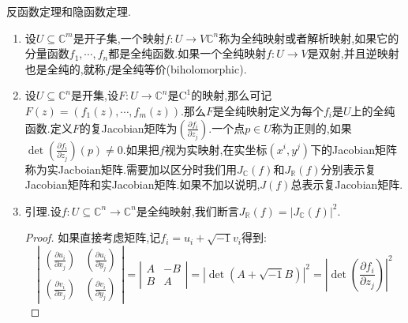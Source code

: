 反函数定理和隐函数定理.
\begin{enumerate}
	\item 设$U\subseteq\mathbb{C}^m$是开子集,一个映射$f:U\to V\mathbb{C}^n$称为全纯映射或者解析映射,如果它的分量函数$f_1,\cdots,f_n$都是全纯函数.如果一个全纯映射$f:U\to V$是双射,并且逆映射也是全纯的,就称$f$是全纯等价(biholomorphic).
	\item 设$U\subseteq\mathbb{C}^n$是开集,设$F:U\to\mathbb{C}^n$是$\mathrm{C}^1$的映射,那么可记$F(z)=(f_1(z),\cdots,f_m(z))$.那么$F$是全纯映射定义为每个$f_i$是$U$上的全纯函数.定义$F$的复Jacobian矩阵为$\left(\frac{\partial f_i}{\partial z_j}\right)$.一个点$p\in U$称为正则的,如果$\det\left(\frac{\partial f_i}{\partial z_j}\right)(p)\not=0$.如果把$f$视为实映射,在实坐标$(x^i,y^j)$下的Jacobian矩阵称为实Jacboian矩阵.需要加以区分时我们用$J_{\mathbb{C}}(f)$和$J_{\mathbb{R}}(f)$分别表示复Jacobian矩阵和实Jacobian矩阵.如果不加以说明,$J(f)$总表示复Jacobian矩阵.
	\item 引理.设$f:U\subseteq\mathbb{C}^n\to\mathbb{C}^n$是全纯映射,我们断言$J_{\mathbb{R}}(f)=|J_{\mathbb{C}}(f)|^2$.
	\begin{proof}
		
		如果直接考虑矩阵,记$f_i=u_i+\sqrt{-1}v_i$得到:
		$$\left|\begin{array}{cc}\left(\frac{\partial u_i}{\partial x_j}\right)&\left(\frac{\partial u_i}{\partial y_j}\right)\\\left(\frac{\partial v_i}{\partial x_j}\right)&\left(\frac{\partial v_i}{\partial y_j}\right)\end{array}\right|=\left|\begin{array}{cc}A&-B\\B&A\end{array}\right|=|\det(A+\sqrt{-1}B)|^2=\left|\det\left(\frac{\partial f_i}{\partial z_j}\right)\right|^2$$
		

\end{proof}
\end{enumerate}
